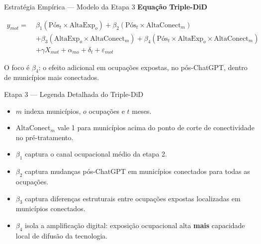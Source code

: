 \documentclass[
  ignorenonframetext,
  aspectratio=169,
]{beamer}
\providecommand{\tightlist}{%
  \setlength{\itemsep}{0pt}\setlength{\parskip}{0pt}}
\begin{document}
\begin{frame}{Estratégia Empírica --- Modelo da Etapa 3}
\label{estratuxe9gia-empuxedrica-modelo-da-etapa-3}
\textbf{Equação Triple-DiD}

\[
\begin{aligned}
y_{mot} =\;&
\beta_1(\text{Pós}_t \times \text{AltaExp}_o)
+ \beta_2(\text{Pós}_t \times \text{AltaConect}_m) \\
&+ \beta_3(\text{AltaExp}_o \times \text{AltaConect}_m)
+ \beta_4(\text{Pós}_t \times \text{AltaExp}_o \times \text{AltaConect}_m) \\
&+ \gamma X_{mot} + \alpha_{mo} + \delta_t + \varepsilon_{mot}
\end{aligned}
\]

\vspace{0.2cm}

O foco é \(\beta_4\): o efeito adicional em ocupações expostas, no
pós-ChatGPT, dentro de municípios mais conectados.
\end{frame}

\begin{frame}{Etapa 3 --- Legenda Detalhada do Triple-DiD}
\label{etapa-3-legenda-detalhada-do-triple-did}
\begin{itemize}
\tightlist
\item
  \(m\) indexa municípios, \(o\) ocupações e \(t\) meses.
\item
  \(\text{AltaConect}_m\) vale 1 para municípios acima do ponto de corte
  de conectividade no pré-tratamento.
\item
  \(\beta_1\) captura o canal ocupacional médio da etapa 2.
\item
  \(\beta_2\) captura mudanças pós-ChatGPT em municípios conectados para
  todas as ocupações.
\item
  \(\beta_3\) captura diferenças estruturais entre ocupações expostas
  localizadas em municípios conectados.
\item
  \(\beta_4\) isola a amplificação digital: exposição ocupacional alta
  \textbf{mais} capacidade local de difusão da tecnologia.
\end{itemize}
\end{frame}
\end{document}
